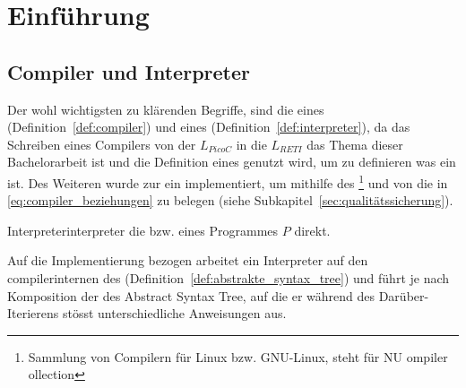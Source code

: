 
\chapter{Einführung}
\label{ch:einführung}

\section{Compiler und Interpreter}
Der wohl wichtigsten zu klärenden Begriffe, sind die eines  (Definition~\ref{def:compiler}) und eines   (Definition~\ref{def:interpreter}), da das Schreiben eines Compilers von der  $L_{PicoC}$ in die  $L_{RETI}$ das Thema dieser Bachelorarbeit ist und die Definition eines  genutzt wird, um zu definieren was ein  ist. Des Weiteren wurde zur  ein  implementiert, um mithilfe des \footnote{Sammlung von Compilern für Linux bzw. GNU-Linux, steht für NU ompiler ollection} und von  die  in \ref{eq:compiler_beziehungen} zu belegen (siehe Subkapitel~\ref{sec:qualitätssicherung}).

\begin{Definition}{Interpreter}{interpreter}
   die  bzw.  eines Programmes $P$ direkt.

  Auf die Implementierung bezogen arbeitet ein Interpreter auf den compilerinternen  des  (Definition~\ref{def:abstrakte_syntax_tree}) und führt je nach Komposition der  des Abstract Syntax Tree, auf die er während des Darüber-Iterierens stösst unterschiedliche Anweisungen aus.
\end{Definition}

